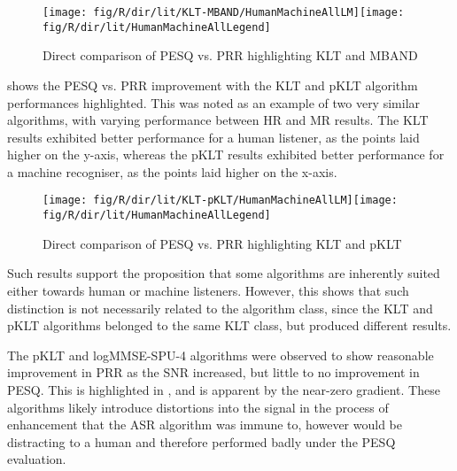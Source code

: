 \begin{figure}[h]
\noindent \begin{centering}
\texttt{[image: fig/R/dir/lit/KLT-MBAND/HumanMachineAllLM]}\texttt{[image: fig/R/dir/lit/HumanMachineAllLegend]}
\par\end{centering}

\protect\caption{\label{fig:direct-klt-mband}Direct comparison of \acs{PESQ} vs.
\acs{PRR} highlighting \acs{KLT} and \acs{MBAND}}
\end{figure}


 shows the \ac{PESQ} vs. \ac{PRR} improvement
with the \ac{KLT} and \ac{pKLT} algorithm performances highlighted.
This was noted as an example of two very similar algorithms, with
varying performance between \ac{HR} and \ac{MR} results. The \ac{KLT}
results exhibited better performance for a human listener, as the
points laid higher on the y-axis, whereas the \ac{pKLT} results exhibited
better performance for a machine recogniser, as the points laid higher
on the x-axis.

\begin{figure}[p]
\noindent \begin{centering}
\texttt{[image: fig/R/dir/lit/KLT-pKLT/HumanMachineAllLM]}\texttt{[image: fig/R/dir/lit/HumanMachineAllLegend]}
\par\end{centering}

\protect\caption{\label{fig:direct-klt-pklt}Direct comparison of \acs{PESQ} vs. \acs{PRR}
highlighting \acs{KLT} and \acs{pKLT}}
\end{figure}


Such results support the proposition that some algorithms are inherently
suited either towards human or machine listeners. However, this shows
that such distinction is not necessarily related to the algorithm
class, since the \ac{KLT} and \ac{pKLT} algorithms belonged to the
same \ac{KLT} class, but produced different results.

The \ac{pKLT} and \ac{logMMSE-SPU-4} algorithms were observed to
show reasonable improvement in \ac{PRR} as the \ac{SNR} increased,
but little to no improvement in \ac{PESQ}. This is highlighted in
, and is apparent by the near-zero
gradient. These algorithms likely introduce distortions into the signal
in the process of enhancement that the \ac{ASR} algorithm was immune
to, however would be distracting to a human and therefore performed
badly under the \ac{PESQ} evaluation.

